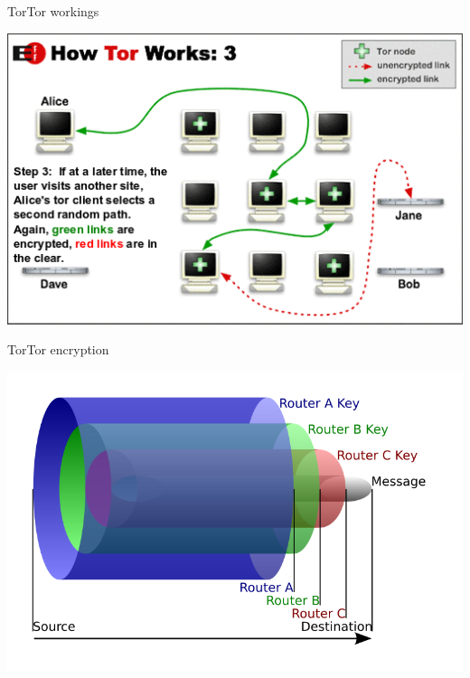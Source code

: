 \begin{frame}{Tor}{Tor workings}
\begin{center}
\includegraphics[scale=0.72]{imgs/tor3.png}
\end{center}
\end{frame}

\begin{frame}{Tor}{Tor encryption}
\begin{center}
	\includegraphics[scale=0.35]{imgs/onion.png}
\end{center}
\end{frame}

